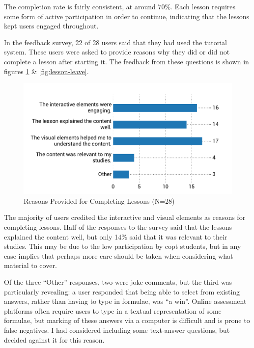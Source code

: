 \documentclass[bsc,twoside,singlespacing,parskip,logo,notimes,normalheadings]{infthesis}
\begin{document}
    The completion rate is fairly consistent, at around 70\%. Each
    lesson requires some form of active participation in order to
    continue, indicating that the lessons kept users engaged
    throughout.

    In the feedback survey, 22 of 28 users said that they had used the
    tutorial system. These users were asked to provide reasons why
    they did or did not complete a lesson after starting it. The
    feedback from these questions is shown in figures
    \ref{fig:lesson-stay} \& \ref{fig:lesson-leave}.

    \begin{figure}[!htb]
      \centering
      \captionsetup{width=\textwidth, justification=centering}
      \caption{Reasons Provided for Completing Lessons (N=28)}\label{fig:lesson-stay}
      \includegraphics[width=\textwidth, trim=0 10 0 45, clip]{img/lesson_staying.pdf}
    \end{figure}

    The majority of users credited the interactive and visual elements
    as reasons for completing lessons. Half of the responses to the
    survey said that the lessons explained the content well, but only
    14\% said that it was relevant to their studies. This may be due
    to the low participation by \gls{copt} students, but in any case
    implies that perhaps more care should be taken when considering
    what material to cover.

    Of the three ``Other'' responses, two were joke comments, but the
    third was particularly revealing: a user responded that being able
    to select from existing answers, rather than having to type in
    formulae, was ``a win''. Online assessment platforms often require
    users to type in a textual representation of some formulae, but
    marking of these answers via a computer is difficult and is prone
    to false negatives. I had considered including some text-answer
    questions, but decided against it for this reason.
\end{document}
